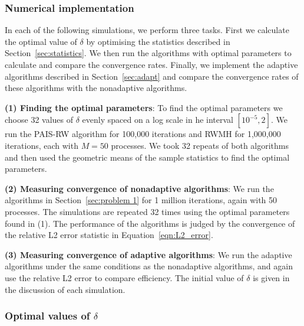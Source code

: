 \documentclass[final]{siamltex}
\begin{document}
\subsubsection{Numerical implementation}\label{sec:Implementation P1}

In each of the following simulations, we perform three tasks. First we calculate the optimal value of $\delta$ by optimising the statistics described in Section~\ref{sec:statistics}. We then run the algorithms with optimal parameters to calculate and compare the convergence rates. Finally, we implement the adaptive algorithms described in Section~\ref{sec:adapt} and compare the convergence rates of these algorithms with the nonadaptive algorithms.

{\bf (1) Finding the optimal parameters}: To find the optimal
parameters we choose 32 values of $\delta$ evenly spaced on a log scale
in he interval $[10^{-5}, 2]$. We run the PAIS-RW algorithm for 100,000 iterations and RWMH for 1,000,000 iterations, each with $M=50$ processes. We took 32 repeats of both algorithms and then used the geometric means of the sample statistics to find the optimal parameters.

{\bf (2) Measuring convergence of nonadaptive algorithms}: We run the algorithms in Section~\ref{sec:problem 1} for 1 million iterations, again with 50 processes. The simulations are repeated 32 times using the optimal parameters found in (1). The performance of the algorithms is judged by the convergence of the relative L2 error statistic in Equation~\ref{eqn:L2_error}.

{\bf (3) Measuring convergence of adaptive algorithms}: We run the
adaptive algorithms under the same conditions as the nonadaptive
algorithms, and again use the relative L2 error to compare
efficiency. The initial value of $\delta$ is given in the discussion
of each simulation.


\subsubsection{Optimal values of $\delta$}\label{sec:Optimal values P1}
\end{document}
